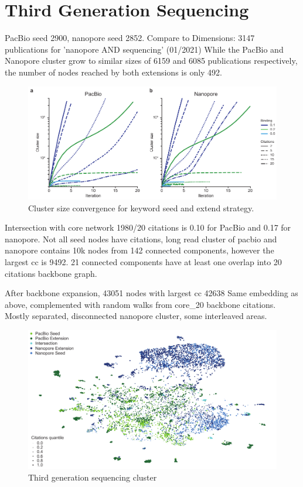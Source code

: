 \section{Third Generation Sequencing}
\label{sec:state_of_art:third_generation}

PacBio seed 2900, nanopore seed 2852.
Compare to Dimensions: 3147 publications for 'nanopore AND sequencing' (01/2021)
While the PacBio and Nanopore cluster grow to similar sizes of 6159 and 6085 publications respectively, the number of nodes reached by both extensions is only 492.


\begin{figure}[h]
	\centering
	\includegraphics[width=1.0\textwidth]{figures/state_of_art/cluster_convergence.pdf}
	\captionsetup{format=plain}
	\caption[Keyword Seed and Extend Convergence]{Cluster size convergence for keyword seed and extend strategy.}
	\label{fig:state_of_art:cluster_convergence}
\end{figure}

Intersection with core network 1980/20 citations is 0.10 for PacBio and 0.17 for nanopore.
Not all seed nodes have citations, long read cluster of pacbio and nanopore contains 10k nodes from 142 connected components, however the largest cc is 9492.
21 connected components have at least one overlap into 20 citations backbone graph.

After backbone expansion, 43051 nodes with largest cc 42638
Same embedding as above, complemented with random walks from core\_20 backbone citations. Mostly separated, disconnected nanopore cluster, some interleaved areas.

\begin{figure}[h]
	\centering
	\includegraphics[width=1.0\textwidth]{figures/state_of_art/umap_lr.pdf}
	\captionsetup{format=plain}
	\caption[Third generation sequencing cluster]{Third generation sequencing cluster}
	\label{fig:state_of_art:umap_lr}
\end{figure}


